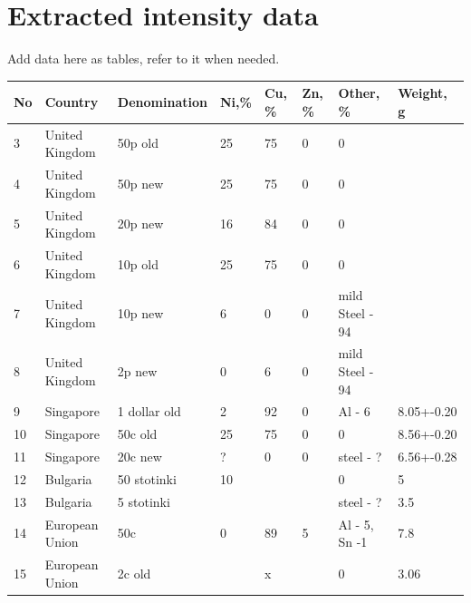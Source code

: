 \documentclass[11pt,a4paper,twoside,onecolumn]{article}
\begin{document}
\section{Extracted intensity data}
Add data here as tables, refer to it when needed.

\begin{table}[htbp]
    \centering
    \begin{tabular}{@{}llllllll@{}}
        \toprule
        No & Country        & Denomination   & Ni,\%    & Cu, \%   & Zn, \% & Other, \%            & Weight, g  \\ \midrule
        3  & United Kingdom & 50p old        & 25       & 75       & 0      & 0                    &            \\
        4  & United Kingdom & 50p new        & 25       & 75       & 0      & 0                    &            \\
        5  & United Kingdom & 20p new        & 16       & 84       & 0      & 0                    &            \\
        6  & United Kingdom & 10p old        & 25       & 75       & 0      & 0                    &            \\
        7  & United Kingdom & 10p new        & 6        & 0        & 0      & mild Steel - 94      &            \\
        8  & United Kingdom & 2p new         & 0        & 6        & 0      & mild Steel - 94      &            \\
        9  & Singapore      & 1 dollar old   & 2        & 92       & 0      & Al - 6               & 8.05+-0.20 \\
        10 & Singapore      & 50c old        & 25       & 75       & 0      & 0                    & 8.56+-0.20 \\
        11 & Singapore      & 20c new        & ?        & 0        & 0      & steel - ?            & 6.56+-0.28 \\
        12 & Bulgaria       & 50 stotinki    & 10       &          &        & 0                    & 5          \\
        13 & Bulgaria       & 5 stotinki     &          &          &        & steel - ?            & 3.5        \\
        14 & European Union & 50c            & 0        & 89       & 5      & Al - 5, Sn -1        & 7.8        \\
        15 & European Union & 2c old         &          & x        &        & 0                    & 3.06       \\

\end{tabular}
\end{table}
\end{document}
